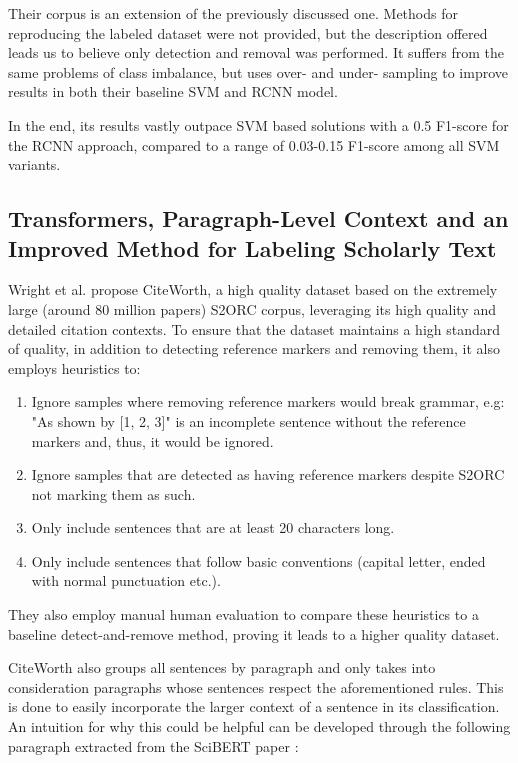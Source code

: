 \documentclass[12pt,a4paper]{report}
\begin{document}
Their corpus \cite{Frber2018AHG} is an extension of the previously discussed one. Methods for reproducing the labeled dataset were not provided, but the description offered leads us to believe only detection and removal was performed. It suffers from the same problems of class imbalance, but uses over- and under- sampling to improve results in both their baseline SVM and RCNN model.

In the end, its results vastly outpace SVM based solutions with a 0.5 F1-score for the RCNN approach, compared to a range of 0.03-0.15 F1-score among all SVM variants.

\subsection{Transformers, Paragraph-Level Context and an Improved Method for Labeling Scholarly Text}\label{citeworth}

Wright et al. \cite{Wright2021CiteWorthCD} propose CiteWorth, a high quality dataset based on the extremely large (around 80 million papers) S2ORC \cite{Lo2020S2ORCTS} corpus, leveraging its high quality and detailed citation contexts. To ensure that the dataset maintains a high standard of quality, in addition to detecting reference markers and removing them, it also employs heuristics to:

\begin{enumerate}
    \item Ignore samples where removing reference markers would break grammar, e.g: "As shown by [1, 2, 3]" is an incomplete sentence without the reference markers and, thus, it would be ignored.
    \item Ignore samples that are detected as having reference markers despite S2ORC not marking them as such.
    \item Only include sentences that are at least 20 characters long.
    \item Only include sentences that follow basic conventions (capital letter, ended with normal punctuation etc.).
\end{enumerate}

They also employ manual human evaluation to compare these heuristics to a baseline detect-and-remove method, proving it leads to a higher quality dataset.

CiteWorth \cite{Wright2021CiteWorthCD} also groups all sentences by paragraph and only takes into consideration paragraphs whose sentences respect the aforementioned rules. This is done to easily incorporate the larger context of a sentence in its classification. An intuition for why this could be helpful can be developed through the following paragraph extracted from the SciBERT paper \cite{beltagy2019scibertpretrainedlanguagemodel}:
\end{document}
